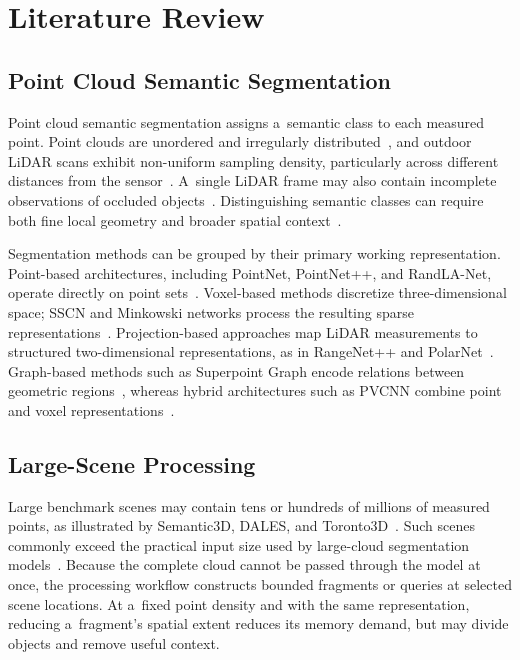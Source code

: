 \section{Literature Review}

\subsection{Point Cloud Semantic Segmentation}

Point cloud semantic segmentation assigns a~semantic class to each measured point. Point clouds are unordered and irregularly distributed~\citep{pointnet,pointconv}, and outdoor LiDAR scans exhibit non-uniform sampling density, particularly across different distances from the sensor~\citep{cylinder3d}. A~single LiDAR frame may also contain incomplete observations of occluded objects~\citep{svqnet}. Distinguishing semantic classes can require both fine local geometry and broader spatial context~\citep{pointnetpp,spg}.

Segmentation methods can be grouped by their primary working representation. Point-based architectures, including PointNet, PointNet++, and RandLA-Net, operate directly on point sets~\citep{pointnet,pointnetpp,randlanet}. Voxel-based methods discretize three-dimensional space; SSCN and Minkowski networks process the resulting sparse representations~\citep{sscn,minkowski}. Projection-based approaches map LiDAR measurements to structured two-dimensional representations, as in RangeNet++ and PolarNet~\citep{rangenet,polarnet}. Graph-based methods such as Superpoint Graph encode relations between geometric regions~\citep{spg}, whereas hybrid architectures such as PVCNN combine point and voxel representations~\citep{pvcnn}.

\subsection{Large-Scene Processing}

Large benchmark scenes may contain tens or hundreds of millions of measured points, as illustrated by Semantic3D, DALES, and Toronto3D~\citep{semantic3d,dales,toronto3d}. Such scenes commonly exceed the practical input size used by large-cloud segmentation models~\citep{randlanet,sensaturban}. Because the complete cloud cannot be passed through the model at once, the processing workflow constructs bounded fragments or queries at selected scene locations. At a~fixed point density and with the same representation, reducing a~fragment's spatial extent reduces its memory demand, but may divide objects and remove useful context.

